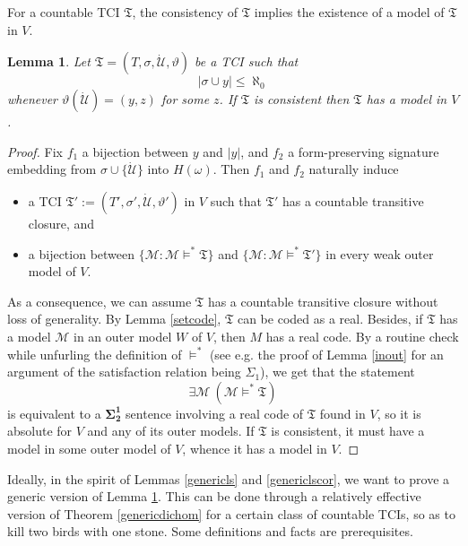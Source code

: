 \documentclass[12pt, twoside]{memoir}
\numberwithin{equation}{section}
\newtheorem{lem}[thm]{Lemma}
\theoremstyle{definition}
\theoremstyle{remark}
\theoremstyle{definition}
\theoremstyle{definition}
\theoremstyle{definition}
\theoremstyle{remark}
\begin{document}
For a countable TCI $\mathfrak{T}$, the consistency of $\mathfrak{T}$ implies the existence of a model of $\mathfrak{T}$ in $V$. 

\begin{lem}\label{modelinV}
Let $\mathfrak{T} = (T, \sigma, \dot{\mathcal{U}}, \vartheta)$ be a TCI such that $$|\sigma \cup y| \leq \aleph_0$$ whenever $\vartheta(\dot{\mathcal{U}}) = (y, z)$ for some $z$. If $\mathfrak{T}$ is consistent then $\mathfrak{T}$ has a model in $V$.
\end{lem}

\begin{proof}
Fix $f_1$ a bijection between $y$ and $|y|$, and $f_2$ a form-preserving signature embedding from $\sigma \cup \{\dot{\mathcal{U}}\}$ into $H(\omega)$. Then $f_1$ and $f_2$ naturally induce
\begin{itemize}
    \item a TCI $\mathfrak{T}' := (T', \sigma', \dot{\mathcal{U}}, \vartheta')$ in $V$ such that $\mathfrak{T}'$ has a countable transitive closure, and
    \item a bijection between $\{\mathcal{M} : \mathcal{M} \models^* \mathfrak{T}\}$ and $\{\mathcal{M} : \mathcal{M} \models^* \mathfrak{T}'\}$ in every weak outer model of $V$.
\end{itemize}
As a consequence, we can assume $\mathfrak{T}$ has a countable transitive closure without loss of generality. By Lemma \ref{setcode}, $\mathfrak{T}$ can be coded as a real. Besides, if $\mathfrak{T}$ has a model $\mathcal{M}$ in an outer model $W$ of $V$, then $M$ has a real code. By a routine check while unfurling the definition of $\models^*$ (see e.g. the proof of Lemma \ref{inout} for an argument of the satisfaction relation being $\Sigma_1$), we get that the statement $$\exists \mathcal{M} \ (\mathcal{M} \models^* \mathfrak{T})$$ is equivalent to a $\mathbf{\Sigma^1_2}$ sentence involving a real code of $\mathfrak{T}$ found in $V$, so it is absolute for $V$ and any of its outer models. If $\mathfrak{T}$ is consistent, it must have a model in some outer model of $V$, whence it has a model in $V$.
\end{proof}

Ideally, in the spirit of Lemmas \ref{genericls} and \ref{genericlscor}, we want to prove a generic version of Lemma \ref{modelinV}. This can be done through a relatively effective version of Theorem \ref{genericdichom} for a certain class of countable TCIs, so as to kill two birds with one stone. Some definitions and facts are prerequisites.
\end{document}
